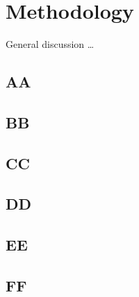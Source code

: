 \chapter{Methodology}

General discussion \ldots

\section{AA}
\section{BB}
\section{CC}
\section{DD}
\section{EE}
\section{FF}
